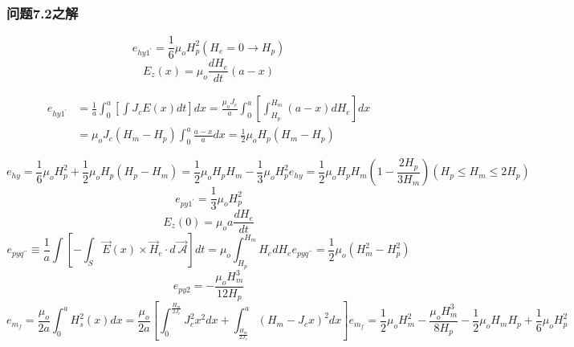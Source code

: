 \subsubsection{问题7.2之解}
\begin{equation}%
e_{hy1^\prime}=\frac{1}{6}\mu_oH_{p}^{2}       (H_e=0\rightarrow H_p)
\end{equation}
\begin{equation}%
E_z(x)=\mu_o\frac{dH_e}{dt}(a-x)
\end{equation}

\begin{subequations}
\begin{align*}%
e_{hy1^\prime}&=\frac{1}{a}\int_{0}^{a}\left[\int J_cE(x)dt\right]dx=\frac{\mu_oJ_c}{a}\int_{0}^{a}\left[\int_{H_p}^{H_m}(a-x)dH_e\right]dx \\
&=\mu_oJ_c(H_m-H_p)\int_{0}^{a}\frac{a-x}{a}dx=\frac{1}{2}\mu_oH_p(H_m-H_p)
\end{align*}
\end{subequations}




\begin{equation}%
e_{hy}=\frac{1}{6}\mu_oH_{p}^{2}+\frac{1}{2}\mu_oH_p(H_p-H_m) 
=\frac{1}{2}\mu_oH_pH_m-\frac{1}{3}\mu_oH_{p}^{2}
e_{hy}=\frac{1}{2}\mu_oH_pH_m\left(1-\frac{2H_p}{3H_m}\right)       (H_p\leq H_m\leq 2H_p)
\end{equation}
\begin{equation}%
e_{py1^\prime}=\frac{1}{3}\mu_oH_{p}^{2}
\end{equation}
\begin{equation}%
E_z(0)=\mu_oa\frac{dH_e}{dt}
\end{equation}
\begin{equation}%
e_{pyq^{\prime\prime}}\equiv\frac{1}{a}\int\left[-\int_{S}\vec{E}(x)\times\vec{H}_e\cdot d\vec{\ \mathcal{A}}\right]dt=\mu_o\int_{H_p}^{H_m}H_edH_e
e_{pyq^{\prime\prime}}=\frac{1}{2}\mu_o(H_{m}^{2}-H_{p}^{2})
\end{equation}
\begin{equation}%
e_{py2}=-\frac{\mu_oH_{m}^{3}}{12H_p}
\end{equation}
\begin{equation}%
e_{m_f}=\frac{\mu_o}{2a}\int_{0}^{a}H_{s}^{2}(x)dx=\frac{\mu_o}{2a}\left[\int_{0}^{\frac{H_m}{2J_c}}J_{c}^{2}x^2dx+\int_{\frac{H_m}{2J_c}}^{a}(H_m-J_cx)^2dx\right]
e_{m_f}=\frac{1}{2}\mu_oH_{m}^{2}-\frac{\mu_oH_{m}^{3}}{8H_p}-\frac{1}{2}\mu_oH_mH_p+\frac{1}{6}\mu_oH_{p}^{2}
\end{equation}

